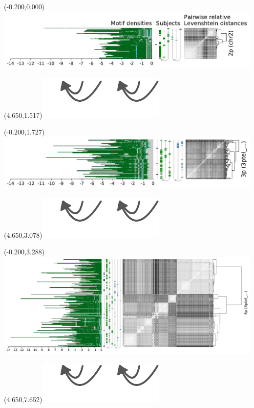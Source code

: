 \documentclass{article}
\begin{document}
\begin{textblock}{13}(-0.200,0.000)\includegraphics{Figure_4/chr2.pdf}\end{textblock}
\begin{textblock}{13}(4.650,1.517)\includegraphics[width=.81in,keepaspectratio]{Figure_4/fatter-arrows.pdf}\end{textblock}

\begin{textblock}{13}(-0.200,1.727)\includegraphics{Figure_4/3ptel_1-500K_1_12_12.pdf}\end{textblock}
\begin{textblock}{13}(4.650,3.078)\includegraphics[width=.81in,keepaspectratio]{Figure_4/fatter-arrows.pdf}\end{textblock}

\begin{textblock}{13}(-0.200,3.288)\includegraphics{Figure_4/4ptel_1-500K_1_12_12.pdf}\end{textblock}
\begin{textblock}{13}(4.650,7.652)\includegraphics[width=.81in,keepaspectratio]{Figure_4/fatter-arrows.pdf}\end{textblock}
\end{document}
